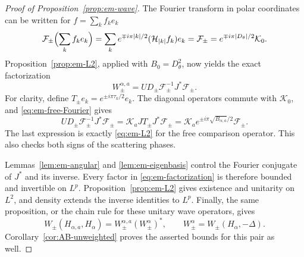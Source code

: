 \documentclass[10pt,a4paper]{amsart}
\newcommand{\HH}{\mathcal H}                 %
\begin{document}
\begin{proof}[Proof of Proposition~\ref{prop:em-wave}]
  The Fourier transform in polar coordinates can be written
  for $f=\sum_k f_ke_k$
  \begin{equation}\label{eq:em-free-Fourier}
    \mathcal F_\pm\Bigl(\sum_k f_ke_k\Bigr)
        =\sum_k e^{\mp i\pi|k|/2}
          (\HH_{|k|}f_k)e_k =
      \mathcal F_\pm
        =e^{\mp i\pi|D_\theta|/2}\mathcal K_0.
  \end{equation}
  Proposition~\ref{prop:em-L2}, applied with $B_0=D_\theta^2$,
  now yields the exact factorization
  \begin{equation}\label{eq:em-factorization}
    W_\pm^{\alpha,a}
    =U D_\pm\mathcal F_\pm^{-1}J^*\mathcal F_\pm.
  \end{equation}
  For clarity, define $T_\pm e_k=e^{\pm i\pi\tau_k/2}e_k$.
  The diagonal operators commute with $\mathcal K_0$, and
  \eqref{eq:em-free-Fourier} gives
  \begin{equation*}
    U D_\pm\mathcal F_\pm^{-1}J^*\mathcal F_\pm
      =\mathcal K_aJ T_\pm J^*\mathcal F_\pm =
      \mathcal K_a e^{\pm i\pi\sqrt{B_{\alpha,a}}/2}
        \mathcal F_\pm.
  \end{equation*}
  The last expression is exactly \eqref{eq:em-L2} for the
  free comparison operator. This also checks both signs of
  the scattering phases.

  Lemmas~\ref{lem:em-angular} and \ref{lem:em-eigenbasis}
  control the Fourier conjugate of $J^*$ and its inverse.
  Every factor in \eqref{eq:em-factorization} is therefore
  bounded and invertible on $L^p$. Proposition~\ref{prop:em-L2}
  gives existence and unitarity on $L^2$, and density extends
  the inverse identities to $L^p$. Finally, the same
  proposition, or the chain rule for these unitary wave
  operators, gives
  \begin{equation*}
    W_\pm(H_{\alpha,a},H_\alpha)
    =W_\pm^{\alpha,a}(W_\pm^\alpha)^*,
    \qquad W_\pm^\alpha=W_\pm(H_\alpha,-\Delta).
  \end{equation*}
  Corollary~\ref{cor:AB-unweighted} proves the asserted
  bounds for this pair as well.
\end{proof}
\end{document}
